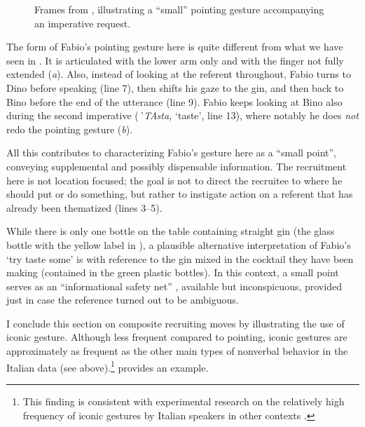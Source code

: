 \documentclass[output=paper,modfonts]{langscibook}
\begin{document}
\begin{figure}
\caption{Frames from , illustrating a “small” pointing gesture accompanying an imperative request.}
\label{fig:rossi:5}
\end{figure}

The form of Fabio's pointing gesture here is quite different from what we have seen in . It is articulated with the lower arm only and with the finger not fully extended (\textit{a}). Also, instead of looking at the referent throughout, Fabio turns to Dino before speaking (line 7), then shifts his gaze to the gin, and then back to Bino before the end of the utterance (line 9). Fabio keeps looking at Bino also during the second imperative (\textit{\`{}TAsta,} ‘taste’, line 13), where notably he does \textit{not} redo the pointing gesture (\textit{b}). 

All this contributes to characterizing Fabio's gesture here as a “small point”, conveying supplemental and possibly dispensable information. The recruitment here is not location focused; the goal is not to direct the recruitee to where he should put or do something, but rather to instigate action on a referent that has already been thematized (lines 3--5).

While there is only one bottle on the table containing straight gin (the glass bottle with the yellow label in ), a plausible alternative interpretation of Fabio's ‘try taste some’ is with reference to the gin mixed in the cocktail they have been making (contained in the green plastic bottles). In this context, a small point serves as an “informational safety net” \citep[1734]{EnfieldKitaRuiter2007}, available but inconspicuous, provided just in case the reference turned out to be ambiguous.

I conclude this section on composite recruiting moves by illustrating the use of iconic gesture. Although less frequent compared to pointing, iconic gestures are approximately as frequent as the other main types of nonverbal behavior in the Italian data (see  above).\footnote{This finding is consistent with experimental research on the relatively high frequency of iconic gestures by Italian speakers in other contexts \citep{Campisi2014}.}  provides an example.
\end{document}
